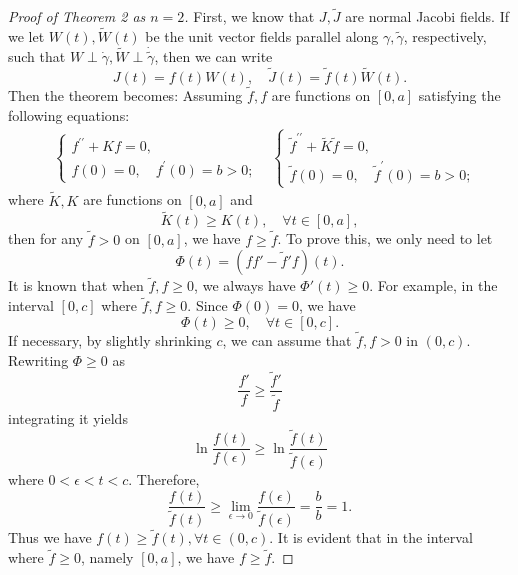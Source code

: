 \documentclass{ctexart}
\begin{document}
\begin{proof}[Proof of Theorem 2 as $n=2$]
  First, we know that $J, \widetilde{J}$ are normal Jacobi fields. If we let $W(t), \widetilde{W}(t)$ be the unit vector fields parallel
  along $\gamma, \widetilde{\gamma}$, respectively, such that $W \perp \dot{\gamma}, \widetilde{W} \perp \dot{\widetilde{\gamma}}$, then we can write
  $$
   J(t)=f(t) W(t), \quad\widetilde{J}(t)=\tilde{f}(t) \widetilde{W}(t).
  $$
  Then the theorem becomes:
  Assuming $\tilde{f}, f$ are functions on $[0, a]$ satisfying the following equations:
  $$
  \begin{aligned}
  & \left\{\begin{array}{l}
  f^{\prime \prime}+K f=0, \\
  f(0)=0, \quad f^{\prime}(0)=b>0 ;
  \end{array}\right.
  & \left\{\begin{array}{l}
    \tilde{f}^{\prime \prime}+\tilde{K} \tilde{f}=0, \\
    \tilde{f}(0)=0, \quad \tilde{f}^{\prime}(0)=b>0 ;
    \end{array}\right. 
  \end{aligned}
  $$
  where $\tilde{K}, K$ are functions on $[0, a]$ and
  $$
  \tilde{K}(t) \geq K(t), \quad \forall t \in[0, a],
  $$
  then for any $\tilde{f}>0$ on $[0, a]$, we have $f \geq \tilde{f}$. To prove this, we only need to let 
  $$
  \Phi(t) = (ff' - \tilde{f}'f)(t).
  $$ 
  It is known that when $\tilde{f},f \geq 0$, we always have $\Phi'(t) \geq 0$. 
  For example, in the interval $[0,c]$ where $\tilde{f},f \geq 0$. Since $\Phi(0)=0$, we have
  $$
  \Phi(t) \geq 0, \quad \forall t \in [0,c].
  $$
  If necessary, by slightly shrinking $c$, we can assume that $\tilde{f},f > 0$ in $(0,c)$. Rewriting $\Phi \geq 0$ as
  \begin{equation}
    \frac{f' }{f} \geq \frac{\tilde{f}'}{\tilde{f}}
  \end{equation}
  integrating it yields
  $$
  \ln\frac{f(t)}{f(\epsilon)} \geq \ln\frac{\tilde{f}(t)}{\tilde{f}(\epsilon)}
  $$
  where $0 < \epsilon < t < c$. Therefore,
  \begin{equation}
    \frac{f(t)}{\tilde{f}(t)} \geq \lim_{\epsilon \rightarrow 0} \frac{f(\epsilon)}{\tilde{f}(\epsilon)} = \frac{b}{b} = 1.
  \end{equation}
  Thus we have $f(t) \geq \tilde{f}(t), \forall t \in (0,c)$. It is evident that in the interval where $\tilde{f} \geq 0$, namely $[0,a]$, we have $f \geq \tilde{f}$.
\end{proof}
\end{document}
